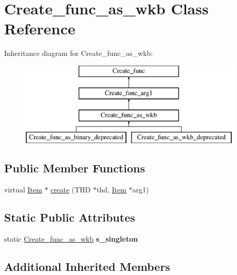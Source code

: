 \hypertarget{classCreate__func__as__wkb}{}\section{Create\+\_\+func\+\_\+as\+\_\+wkb Class Reference}
\label{classCreate__func__as__wkb}
Inheritance diagram for Create\+\_\+func\+\_\+as\+\_\+wkb\+:\begin{figure}[H]
\begin{center}
\leavevmode
\includegraphics[height=4.000000cm]{classCreate__func__as__wkb}
\end{center}
\end{figure}
\subsection*{Public Member Functions}
\begin{DoxyCompactItemize}
\item 
virtual \mbox{\hyperlink{classItem}{Item}} $\ast$ \mbox{\hyperlink{classCreate__func__as__wkb_a23a8a1800ba7753c66e680e35451d8a4}{create}} (T\+HD $\ast$thd, \mbox{\hyperlink{classItem}{Item}} $\ast$arg1)
\end{DoxyCompactItemize}
\subsection*{Static Public Attributes}
\begin{DoxyCompactItemize}
\item 
\mbox{\label{classCreate__func__as__wkb_a87ed739e535716640cfe7d93e4c43ad1}} 
static \mbox{\hyperlink{classCreate__func__as__wkb}{Create\+\_\+func\+\_\+as\+\_\+wkb}} {\bfseries s\+\_\+singleton}
\end{DoxyCompactItemize}
\subsection*{Additional Inherited Members}


